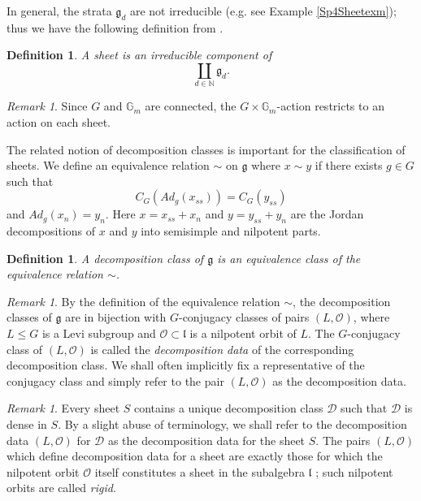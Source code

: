 \documentclass{amsart}
\newtheorem{definition}[theorem]{Definition}
\theoremstyle{remark}
\newtheorem{remark}[theorem]{Remark}
\numberwithin{theorem}{section}
\numberwithin{equation}{section}
\begin{document}
In general, the strata $\mathfrak{g}_d$ are not irreducible (e.g. see Example \ref{Sp4Sheetexm}); thus we have the following definition from \cite{BK}.

\begin{definition}\label{Sheetdef}
    A \emph{sheet} is an irreducible component of 
    $$\coprod_{d \in \mathbb{N}} \mathfrak{g}_d.$$
\end{definition}

\begin{remark}\label{ActionsSheetsrmk}
   Since $G$ and $\mathbb{G}_m$ are connected, the $G \times \mathbb{G}_m$-action restricts to an action on each sheet.
\end{remark}

The related notion of decomposition classes is important for the classification of sheets. We define an equivalence relation $\sim$ on $\mathfrak{g}$ where $x \sim y$ if there exists $g \in G$ such that 
\begin{equation}
    C_G(Ad_g(x_{ss})) = C_G(y_{ss})
\end{equation}
and $Ad_g(x_n) = y_n$. Here $x = x_{ss}+x_n$ and $y=y_{ss}+y_n$ are the Jordan decompositions of $x$ and $y$ into semisimple and nilpotent parts.

\begin{definition}\label{Decompclassdef}
    A \emph{decomposition class} of $\mathfrak{g}$ is an equivalence class of the equivalence relation $\sim$.
\end{definition}

\begin{remark}\label{Decompdatarmk}
    By the definition of the equivalence relation $\sim$, the decomposition classes of $\mathfrak{g}$ are in bijection with $G$-conjugacy classes of pairs $(L,\mathcal O)$, where $L \leq G$ is a Levi subgroup and $\mathcal O \subset \mathfrak{l}$ is a nilpotent orbit of $L$. The $G$-conjugacy class of $(L, \mathcal O)$ is called the \emph{decomposition data} of the corresponding decomposition class. We shall often implicitly fix a representative of the conjugacy class and simply refer to the pair $(L,\mathcal O)$ as the decomposition data.
\end{remark} 

\begin{remark}\label{SheetClassificationrmk}
    Every sheet $S$ contains a unique decomposition class $\mathcal D$ such that $\mathcal D$ is dense in $S$. By a slight abuse of terminology, we shall refer to the decomposition data $(L,\mathcal O)$ for $\mathcal D$ as the decomposition data for the sheet $S$. The pairs $(L, \mathcal O)$ which define decomposition data for a sheet are exactly those for which the nilpotent orbit $\mathcal O$ itself constitutes a sheet in the subalgebra $\mathfrak{l}$ \cite[Satz 4.3 and Korollar 4.4]{Borho2}; such nilpotent orbits are called \emph{rigid}.
\end{remark}
\end{document}

